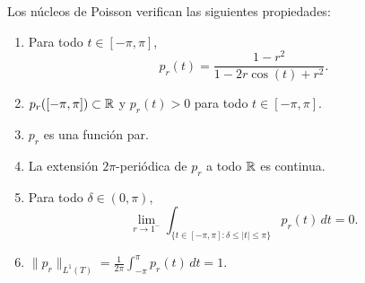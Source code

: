 \documentclass[a4paper, 11pt, oneside]{report}
\begin{document}
\begin{proposition}
  Los núcleos de Poisson verifican las siguientes propiedades:
  \begin{enumerate}
    \item Para todo $t \in [-\pi,\pi]$, 
    \[p_r(t) = \frac{1-r^2}{1-2r \cos(t)+r^2}.\]
    \item $p_r([-\pi,\pi]) \subset \mathbb R$ y $p_r(t) > 0$ para todo $t \in [-\pi,\pi]$.
    \item $p_r$ es una función par.
    \item La extensión $2\pi$-periódica de $p_r$ a todo $\mathbb R$ es continua.
    \item Para todo $\delta \in (0,\pi)$,
    \[\lim_{r \to 1^-} \int_{\{t \in [-\pi,\pi] \colon \delta \leq |t| \leq \pi\}} p_r(t) \, dt = 0.\]
    \item $\displaystyle \|p_r\|_{L^1(T)}= \frac{1}{2\pi}\int_{-\pi}^\pi p_r(t) \, dt = 1.$
  \end{enumerate}
\end{proposition}
\end{document}
